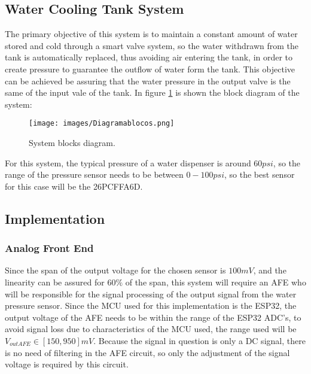 \subsection{Water Cooling Tank System}

The primary objective of this system is to maintain a constant amount of water stored and cold through a smart valve system, so the water withdrawn from the tank is automatically replaced, thus avoiding air entering the tank, in order to create pressure to guarantee the outflow of water form the tank. This objective can be achieved be assuring that the water pressure in the output valve is the same of the input vale of the tank. In figure \ref{DiagramaBlocos} is shown the block diagram of the system:

\begin{figure}[H]
    \centering
    \texttt{[image: images/Diagramablocos.png]}
    \caption{System blocks diagram.} 
    \label{DiagramaBlocos}   
\end{figure}

For this system, the typical pressure of a water dispenser is around $60 psi$, so the range of the pressure sensor needs to be between $0-100 psi$, so the best sensor for this case will be the 26PCFFA6D\textsuperscript{\cite{26PC-Datasheet}}.

\subsection{Implementation}

\subsubsection{Analog Front End}
Since the span of the output voltage for the chosen sensor is $100 mV$, and the linearity can be assured for $60\%$ of the span\textsuperscript{\cite{26PC-Datasheet}}, this system will require an AFE who will be responsible for the signal processing of the output signal from the water pressure sensor. Since the MCU used for this implementation is the ESP32, the output voltage of the AFE needs to be within the range of the ESP32 ADC's, to avoid signal loss due to characteristics of the MCU used\textsuperscript{\cite{ESP-IDF-Programming-Guide}}, the range used will be $V_{outAFE} \in [150, 950] mV$. Because the signal in question is only a DC signal, there is no need of filtering in the AFE circuit, so only the adjustment of the signal voltage is required by this circuit.

